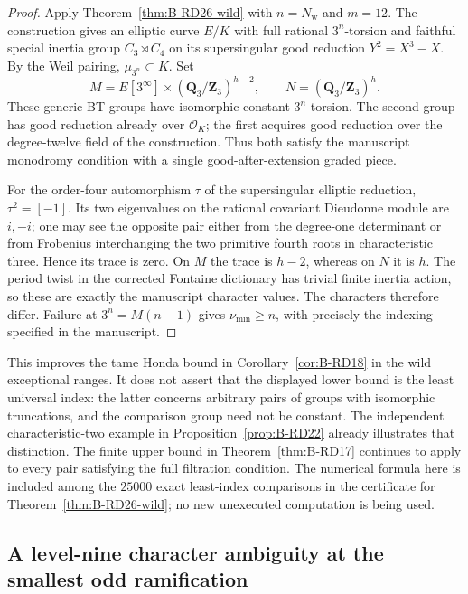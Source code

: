\begin{proof}
Apply Theorem~\ref{thm:B-RD26-wild} with $n=N_{\mathrm w}$ and
$m=12$. The construction gives an elliptic curve $E/K$ with
full rational $3^n$-torsion and faithful special inertia group
$C_3\rtimes C_4$ on its supersingular good reduction
$Y^2=X^3-X$. By the Weil pairing, $\mu_{3^n}\subset K$.
Set
\[
 M=E[3^\infty]\times(\mathbf Q_3/\mathbf Z_3)^{h-2},
 \qquad N=(\mathbf Q_3/\mathbf Z_3)^h.
\]
These generic BT groups have isomorphic constant $3^n$-torsion.
The second group has good reduction already over $\mathcal O_K$;
the first acquires good reduction over the degree-twelve field
of the construction. Thus both satisfy the manuscript monodromy
condition with a single good-after-extension graded piece.

For the order-four automorphism $\tau$ of the supersingular
elliptic reduction, $\tau^2=[-1]$. Its two eigenvalues on the
rational covariant Dieudonne module are $i,-i$; one may see the
opposite pair either from the degree-one determinant or from
Frobenius interchanging the two primitive fourth roots in
characteristic three. Hence its trace is zero. On $M$ the trace
is $h-2$, whereas on $N$ it is $h$. The period twist in the
corrected Fontaine dictionary has trivial finite inertia action,
so these are exactly the manuscript character values.
The characters therefore differ. Failure at
$3^n=M(n-1)$ gives $\nu_{\min}\geq n$, with precisely the indexing
specified in the manuscript.
\end{proof}

\begin{remark}\label{auto:B:688dec0e6255}

This improves the tame Honda bound in
Corollary~\ref{cor:B-RD18} in the wild exceptional ranges.
It does not assert that the displayed lower bound is the least
universal index: the latter concerns arbitrary pairs of groups
with isomorphic truncations, and the comparison group need not
be constant. The independent characteristic-two example in
Proposition~\ref{prop:B-RD22} already illustrates that distinction.
The finite upper bound in Theorem~\ref{thm:B-RD17} continues to
apply to every pair satisfying the full filtration condition.
The numerical formula here is included among the $25000$ exact
least-index comparisons in the certificate for
Theorem~\ref{thm:B-RD26-wild}; no new unexecuted computation is
being used.
\end{remark}


\subsection{A level-nine character ambiguity at the smallest odd ramification}

